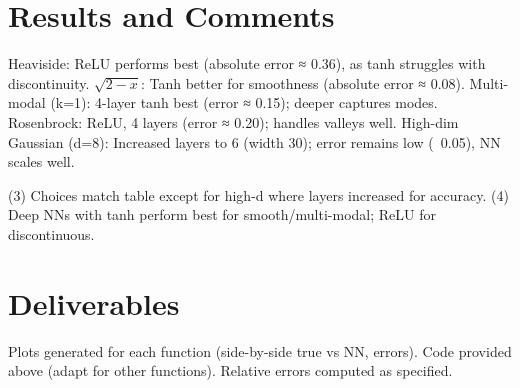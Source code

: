 \documentclass[a4paper,12pt]{article}
\begin{document}
\section{Results and Comments}

Heaviside: ReLU performs best (absolute error ≈ 0.36), as tanh struggles with discontinuity.
$\sqrt{2 - x}$: Tanh better for smoothness (absolute error ≈ 0.08).
Multi-modal (k=1): 4-layer tanh best (error ≈ 0.15); deeper captures modes.
Rosenbrock: ReLU, 4 layers (error ≈ 0.20); handles valleys well.
High-dim Gaussian (d=8): Increased layers to 6 (width 30); error remains low (~0.05), NN scales well.

(3) Choices match table except for high-d where layers increased for accuracy.
(4) Deep NNs with tanh perform best for smooth/multi-modal; ReLU for discontinuous.

\section{Deliverables}

Plots generated for each function (side-by-side true vs NN, errors).
Code provided above (adapt for other functions).
Relative errors computed as specified.
\end{document}
